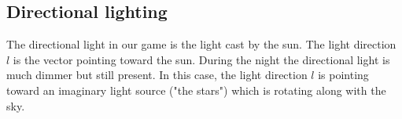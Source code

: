 \subsection{Directional lighting} \label{subsec:directional-lighting}
The directional light in our game is the light cast by the sun.
The light direction $l$ is the vector pointing toward the sun.
During the night the directional light is much dimmer but still present.
In this case, the light direction $l$ is pointing toward an imaginary light source ("the stars") which is rotating along with the sky.